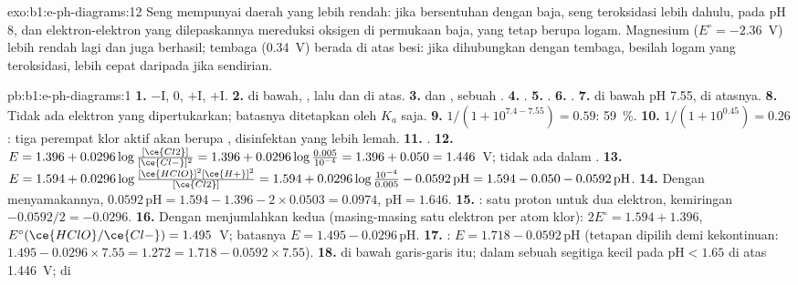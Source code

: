 \begin{solution}{exo:b1:e-ph-diagrams:12}
Seng mempunyai daerah yang lebih rendah: jika bersentuhan dengan baja,
seng teroksidasi lebih dahulu,  pada
pH 8, dan elektron-elektron yang dilepaskannya mereduksi oksigen di
permukaan baja, yang tetap berupa logam. Magnesium ($E^\circ = -2.36$~V)
lebih rendah lagi dan juga berhasil; tembaga (0.34~V) berada di atas
besi: jika dihubungkan dengan tembaga, besilah logam yang teroksidasi,
lebih cepat daripada jika sendirian.
\end{solution}

\begin{solution}{pb:b1:e-ph-diagrams:1}
\textbf{1.} $-$I, 0, $+$I, $+$I.
\textbf{2.}  di bawah, , lalu  dan  di
atas.
\textbf{3.}  dan , sebuah .
\textbf{4.} .
\textbf{5.} .
\textbf{6.} .
\textbf{7.}  di bawah pH 7.55,  di atasnya.
\textbf{8.} Tidak ada elektron yang dipertukarkan; batasnya ditetapkan
oleh $K_a$ saja.
\textbf{9.} $1/(1 + 10^{7.4 - 7.55}) = 0.59$: \qty{59}{\percent}.
\textbf{10.} $1/(1 + 10^{0.45}) = 0.26$: tiga perempat klor aktif akan
berupa , disinfektan yang lebih lemah.
\textbf{11.} .
\textbf{12.} $E = 1.396 + 0.0296\log\frac{[\ce{Cl2}]}{[\ce{Cl-}]^2} = 1.396
+ 0.0296\log\frac{0.005}{10^{-4}} = 1.396 + 0.050 = 1.446$~V; tidak ada
 dalam .
\textbf{13.} $E = 1.594 + 0.0296\log\frac{[\ce{HClO}]^2[\ce{H+}]^2}{[\ce{Cl2}]}
= 1.594 + 0.0296\log\frac{10^{-4}}{0.005} - 0.0592\,\mathrm{pH} = 1.594 -
0.050 - 0.0592\,\mathrm{pH}$.
\textbf{14.} Dengan menyamakannya, $0.0592\,\mathrm{pH} = 1.594 - 1.396 - 2 \times 0.0503
= 0.0974$, $\mathrm{pH} = 1.646$.
\textbf{15.} : satu proton untuk dua
elektron, kemiringan $-0.0592/2 = -0.0296$.
\textbf{16.} Dengan menjumlahkan kedua  (masing-masing
satu elektron per atom klor): $2E^\circ = 1.594 + 1.396$,
$E^\circ(\ce{HClO}/\ce{Cl-}) =
1.495$~V; batasnya $E = 1.495 - 0.0296\,\mathrm{pH}$.
\textbf{17.} : $E = 1.718 - 0.0592\,\mathrm{pH}$
(tetapan dipilih demi kekontinuan: $1.495 - 0.0296 \times 7.55 = 1.272 = 1.718
- 0.0592 \times 7.55$).
\textbf{18.}  di bawah garis-garis itu;  dalam sebuah
segitiga kecil pada $\mathrm{pH} < 1.65$ di atas 1.446~V;  di

\end{solution}
